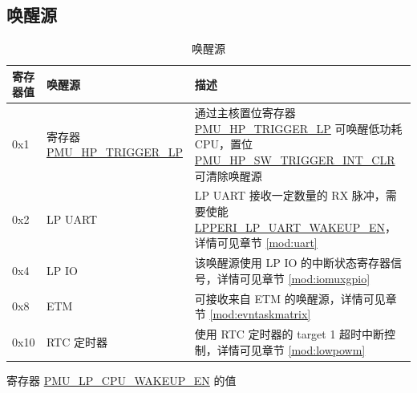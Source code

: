 \documentclass[main\_\_CN.tex]{subfiles}
\begin{document}
\subsection{唤醒源}

    \begin{table}[H]
    \centering
    \caption{唤醒源}
    \label{tab:ulp-wake-sources}
    \begin{threeparttable}
    \begin{tabular}{| l | l | m{6cm}|}
    \hline
    \rowcolor{lightgray}
    寄存器值\tnote{1} & 唤醒源 & 描述  \\\hline

    0x1  & 寄存器 \hyperref[fielddesc:PMUHPTRIGGERLP]{PMU\_HP\_TRIGGER\_LP} & 通过主核置位寄存器 \hyperref[fielddesc:PMUHPTRIGGERLP]{PMU\_HP\_TRIGGER\_LP} 可唤醒低功耗 CPU，置位 \hyperref[fielddesc:PMUHPSWTRIGGERINTCLR]{PMU\_HP\_SW\_TRIGGER\_INT\_CLR} 可清除唤醒源\\\hline
    0x2  & LP UART & LP UART 接收一定数量的 RX 脉冲，需要使能 \hyperref[fielddesc:LPPERILPUARTWAKEUPEN]{LPPERI\_LP\_UART\_WAKEUP\_EN}，详情可见章节 \ref{mod:uart} \textit{\nameref{mod:uart}} \\\hline
    0x4  & LP IO & 该唤醒源使用 LP IO 的中断状态寄存器信号，详情可见章节 \ref{mod:iomuxgpio} \textit{\nameref{mod:iomuxgpio}} \\\hline
    0x8  & ETM & 可接收来自 ETM 的唤醒源，详情可见章节 \ref{mod:evntaskmatrix} \textit{\nameref{mod:evntaskmatrix}} \\\hline
    0x10 & RTC 定时器 & 使用 RTC 定时器的 target 1 超时中断控制，详情可见章节 \ref{mod:lowpowm} \textit{\nameref{mod:lowpowm}} \\\hline
\end{tabular}
    \begin{tablenotes}
        \item[1] 寄存器 \hyperref[fielddesc:PMULPCPUWAKEUPEN]{PMU\_LP\_CPU\_WAKEUP\_EN} 的值
    \end{tablenotes}
    \end{threeparttable}
\end{table}
\end{document}

